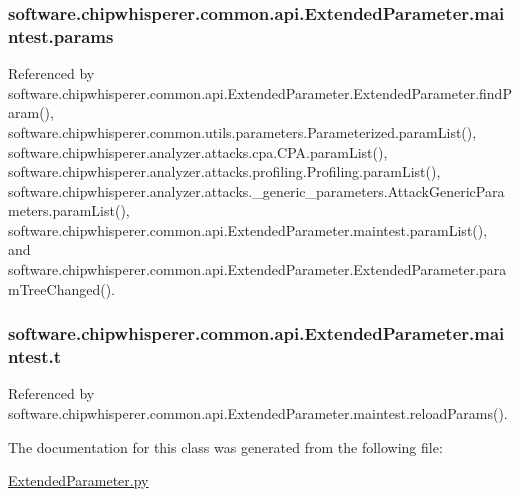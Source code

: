 \subsubsection[{params}]{\setlength{\rightskip}{0pt plus 5cm}software.\+chipwhisperer.\+common.\+api.\+Extended\+Parameter.\+maintest.\+params}\label{classsoftware_1_1chipwhisperer_1_1common_1_1api_1_1ExtendedParameter_1_1maintest_aefa1ef95d164e89a25d411223e78f525}


Referenced by software.\+chipwhisperer.\+common.\+api.\+Extended\+Parameter.\+Extended\+Parameter.\+find\+Param(), software.\+chipwhisperer.\+common.\+utils.\+parameters.\+Parameterized.\+param\+List(), software.\+chipwhisperer.\+analyzer.\+attacks.\+cpa.\+C\+P\+A.\+param\+List(), software.\+chipwhisperer.\+analyzer.\+attacks.\+profiling.\+Profiling.\+param\+List(), software.\+chipwhisperer.\+analyzer.\+attacks.\+\_\+generic\+\_\+parameters.\+Attack\+Generic\+Parameters.\+param\+List(), software.\+chipwhisperer.\+common.\+api.\+Extended\+Parameter.\+maintest.\+param\+List(), and software.\+chipwhisperer.\+common.\+api.\+Extended\+Parameter.\+Extended\+Parameter.\+param\+Tree\+Changed().

\hypertarget{classsoftware_1_1chipwhisperer_1_1common_1_1api_1_1ExtendedParameter_1_1maintest_adf9172b5d72cabec43fbb73e5b4775d2}{}
\subsubsection[{t}]{\setlength{\rightskip}{0pt plus 5cm}software.\+chipwhisperer.\+common.\+api.\+Extended\+Parameter.\+maintest.\+t}\label{classsoftware_1_1chipwhisperer_1_1common_1_1api_1_1ExtendedParameter_1_1maintest_adf9172b5d72cabec43fbb73e5b4775d2}


Referenced by software.\+chipwhisperer.\+common.\+api.\+Extended\+Parameter.\+maintest.\+reload\+Params().



The documentation for this class was generated from the following file\+:\begin{DoxyCompactItemize}
\item 
\hyperlink{ExtendedParameter_8py}{Extended\+Parameter.\+py}\end{DoxyCompactItemize}
